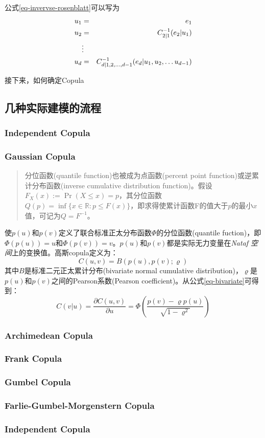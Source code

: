 公式\ref{eq-invervse-rosenblatt}可以写为
\begin{eqnarray}
    \label{eq-inverse-transform-using-copula}
    u_1 &=& e_1 \notag \\
    u_2 &=& C_{2|1}^{-1}(e_2|u_1) \notag\\
    &\vdots& \\
    u_d &=& C_{d|1,2,\dots,d-1}^{-1}(e_d|u_1,u_2,\dots u_{d-1}) \notag
\end{eqnarray}

接下来，如何确定Copula


\subsection{几种实际建模的流程}

\subsubsection{Independent Copula}
\subsubsection{Gaussian Copula}
\begin{quotation}
    分位函数(quantile function)也被成为点函数(percent point function)或逆累计分布函数(inverse cumulative distribution function)。假设$F_X(x) := \Pr (X \leq x) = p$，其分位函数$Q(p) = \inf\{x \in \mathbb{R} : p \leq F(x)\}$，即求得使累计函数F的值大于$p$的最小$x$值，可记为$Q = F^{-1}$。
\end{quotation}

使$p(u)$和$p(v)$定义了联合标准正太分布函数$\Phi$的\textcolor[rgb]{1,0,0}{分位函数(quantile fuction)}，即$\Phi(p(u)) = u$和$\Phi(p(v))=v$。$p(u)$和$p(v)$都是实际无力变量在\emph{Nataf 空间}上的变换值。高斯copula定义为：
\begin{equation}
    \label{eq-gaussiancopula}
    C(u,v) = B(p(u),p(v);\varrho)
\end{equation}
其中$B$是标准二元正太累计分布(bivariate normal cumulative distribution)，$\varrho$是$p(u)$和$p(v)$之间的Pearson系数(Pearson coefficient)。从公式\ref{eq-bivariate}可得到：
\begin{equation} 
    \label{eq-copula-bivariate}
    C(v|u) = \dfrac{\partial C(u,v)}{\partial u} = \Phi \left(\dfrac{p(v)-\varrho p(u)}{\sqrt{1-\varrho^{2}}}\right)
\end{equation} 

\subsubsection{Archimedean Copula}
\subsubsection{Frank Copula}
\subsubsection{Gumbel Copula}
\subsubsection{Farlie-Gumbel-Morgenstern  Copula}
\subsubsection{Independent Copula}
